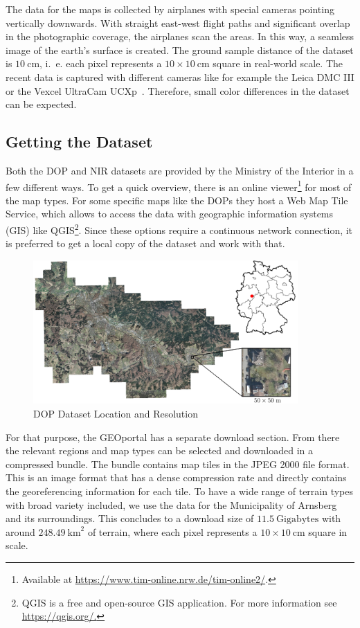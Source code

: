 The data for the maps is collected by airplanes with special cameras pointing vertically downwards. With straight east-west flight paths and significant overlap in the photographic coverage, the airplanes scan the areas. In this way, a seamless image of the earth's surface is created. The ground sample distance of the dataset is $10~\text{cm}$, i.~e. each pixel represents a $10\times 10~\text{cm}$ square in real-world scale. The recent data is captured with different cameras like for example the Leica DMC III or the Vexcel UltraCam UCXp~\cite{topo-image16}. Therefore, small color differences in the dataset can be expected.

\subsection{Getting the Dataset}
Both the DOP and NIR datasets are provided by the Ministry of the Interior in a few different ways. To get a quick overview, there is an online viewer\footnote{Available at \url{https://www.tim-online.nrw.de/tim-online2/}.} for most of the map types. For some specific maps like the DOPs they host a Web Map Tile Service, which allows to access the data with geographic information systems (GIS) like QGIS\footnote{QGIS is a free and open-source GIS application. For more information see \url{https://qgis.org/.}}. Since these options require a continuous network connection, it is preferred to get a local copy of the dataset and work with that.

\begin{figure}[h]
    \centering
    \includegraphics[width=0.9\textwidth]{images/dop_rgb_all}
    \caption{DOP Dataset Location and Resolution}
    \label{fig:dop_rgb_all}
\end{figure}

For that purpose, the GEOportal has a separate download section. From there the relevant regions and map types can be selected and downloaded in a compressed bundle. The bundle contains map tiles in the JPEG 2000 file format. This is an image format that has a dense compression rate and directly contains the georeferencing information for each tile. To have a wide range of terrain types with broad variety included, we use the data for the Municipality of Arnsberg and its surroundings. This concludes to a download size of $11.5~\text{Gigabytes}$ with around $248.49~\text{km}^2$ of terrain, where each pixel represents a $10\times 10~\text{cm}$ square in scale.

